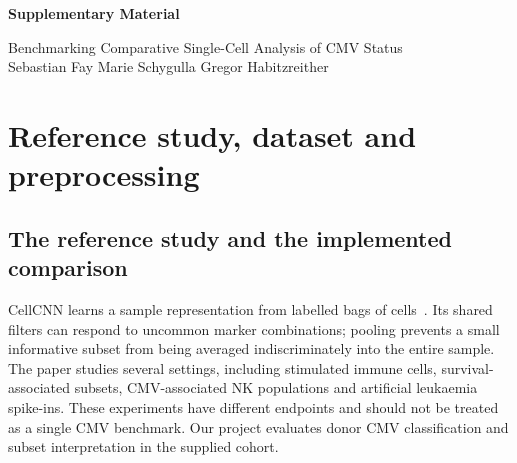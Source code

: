 \documentclass[11pt,a4paper]{article}
\begin{document}
\begin{center}
{\Large\bfseries Supplementary Material\par}
\vspace{3pt}
Benchmarking Comparative Single-Cell Analysis of CMV Status\\
Sebastian Fay \quad Marie Schygulla \quad Gregor Habitzreither
\end{center}

\section{Reference study, dataset and preprocessing}
\subsection{The reference study and the implemented comparison}
CellCNN learns a sample representation from labelled bags of cells~\cite{cellcnn}. Its shared filters can respond to uncommon marker combinations; pooling prevents a small informative subset from being averaged indiscriminately into the entire sample. The paper studies several settings, including stimulated immune cells, survival-associated subsets, CMV-associated NK populations and artificial leukaemia spike-ins. These experiments have different endpoints and should not be treated as a single CMV benchmark. Our project evaluates donor CMV classification and subset interpretation in the supplied cohort.
\end{document}
